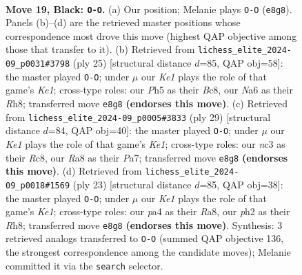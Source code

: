 \documentclass[11pt]{article}
\begin{document}
\begin{figure}[p]
\label{fig:thought-m35}
\end{figure}

\clearpage

\begin{figure}[p]\centering
\begin{subfigure}{0.46\textwidth}\centering
\resizebox{\linewidth}{!}{%
\newchessgame
\chessboard[
  setfen={r2qk2r/ppp1b3/n4pp1/5b1p/P1pP4/2N4N/RPP1RPPP/2BQ2K1 b kq - 1 19},
  showmover=false,
  pgfstyle=straightmove, color=movearrow, markmove={e8-g8}
]}
\caption{}
\end{subfigure}\hfill
\begin{subfigure}{0.46\textwidth}\centering
\resizebox{\linewidth}{!}{%
\newchessgame
\chessboard[
  setfen={r1bqk2r/p3bpp1/2p2n1p/n7/8/1P3N2/P1PP1PPP/RNBQR1K1 b kq - 0 13},
  showmover=false,
  pgfstyle=straightmove, color=movearrow, markmove={e8-g8}
]}
\caption{}
\end{subfigure}
\\[4pt]
\begin{subfigure}{0.46\textwidth}\centering
\resizebox{\linewidth}{!}{%
\newchessgame
\chessboard[
  setfen={2rqk2r/pp2bppp/2n1p3/4P2b/3P4/1PP1BN2/5PPP/RN1QR1K1 b k - 4 15},
  showmover=false,
  pgfstyle=straightmove, color=movearrow, markmove={e8-g8}
]}
\caption{}
\end{subfigure}\hfill
\begin{subfigure}{0.46\textwidth}\centering
\resizebox{\linewidth}{!}{%
\newchessgame
\chessboard[
  setfen={r2qk2r/pbp1bp1p/1p2pn2/5p2/3P4/2N2NP1/PPP1QPBP/2KR3R b kq - 3 12},
  showmover=false,
  pgfstyle=straightmove, color=movearrow, markmove={e8-g8}
]}
\caption{}
\end{subfigure}
\caption{\textbf{Move 19, Black: \texttt{O-O}.} (a) Our position; Melanie plays \texttt{O-O} (\texttt{e8g8}). Panels (b)--(d) are the retrieved master positions whose correspondence most drove this move (highest QAP objective among those that transfer to it). (b) Retrieved from \texttt{lichess\_elite\_2024-09\_p0031\#3798} (ply 25) [structural distance $d$=85, QAP obj=58]: the master played \texttt{O-O}; under $\mu$ our \emph{Ke1} plays the role of that game's \emph{Ke1}; cross-type roles: our \emph{P}h5 as their \emph{B}c8, our \emph{N}a6 as their \emph{R}h8; transferred move \texttt{e8g8} \textbf{(endorses this move)}. (c) Retrieved from \texttt{lichess\_elite\_2024-09\_p0005\#3833} (ply 29) [structural distance $d$=84, QAP obj=40]: the master played \texttt{O-O}; under $\mu$ our \emph{Ke1} plays the role of that game's \emph{Ke1}; cross-type roles: our \emph{n}c3 as their \emph{R}c8, our \emph{R}a8 as their \emph{P}a7; transferred move \texttt{e8g8} \textbf{(endorses this move)}. (d) Retrieved from \texttt{lichess\_elite\_2024-09\_p0018\#1569} (ply 23) [structural distance $d$=85, QAP obj=38]: the master played \texttt{O-O}; under $\mu$ our \emph{Ke1} plays the role of that game's \emph{Ke1}; cross-type roles: our \emph{p}a4 as their \emph{R}a8, our \emph{p}h2 as their \emph{R}h8; transferred move \texttt{e8g8} \textbf{(endorses this move)}. Synthesis: 3 retrieved analogs transferred to \texttt{O-O} (summed QAP objective 136, the strongest correspondence among the candidate moves); Melanie committed it via the \texttt{search} selector.}

\end{figure}
\end{document}
